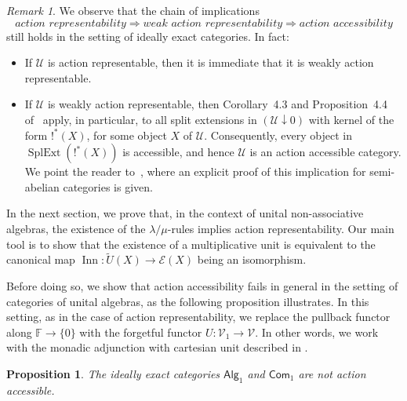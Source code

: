 \documentclass[reqno,a4paper]{amsart}
\theoremstyle{plain}
\newtheorem{proposition}[subsection]{Proposition}
\theoremstyle{definition}
\theoremstyle{remark}
\newtheorem{remark}[subsection]{Remark}
\numberwithin{equation}{section}
\newcommand{\F}{\mathbb{F}}
\newcommand{\E}{\mathcal{E}}
\newcommand{\V}{\mathcal{V}}
\newcommand{\U}{\mathcal{U}}
\DeclareMathOperator{\SplExt}{SplExt}
\DeclareMathOperator{\Inn}{Inn}
\newcommand{\Com}{\ensuremath{\mathsf{Com}}}
\newcommand{\Alg}{\ensuremath{\mathsf{Alg}}}
\begin{document}
\begin{remark}
We observe that the chain of implications
\[
\textit{action representability}\Rightarrow\textit{weak action representability}\Rightarrow\textit{action accessibility}
\]
still holds in the setting of ideally exact categories. In fact:
\begin{itemize}
\item If $\U$ is action representable, then it is immediate that it is weakly action representable.
\item If $\U$ is weakly action representable, then Corollary~4.3 and Proposition~4.4 of~\cite{WRA} apply, in particular, to all split extensions in $(\U \downarrow 0)$ with kernel of the form $!^*(X)$, for some object $X$ of $\U$. Consequently, every object in $\SplExt(!^*(X))$ is accessible, and hence $\U$ is an action accessible category. We point the reader to~\cite[Section 2]{Mancini_Thesis}, where an explicit proof of this implication for semi-abelian categories is given.
\end{itemize}
\end{remark}

In the next section, we prove that, in the context of unital non-associative algebras, the existence of the $\lambda/\mu$-rules implies action representability. Our main tool is to show that the existence of a multiplicative unit is equivalent to the canonical map $\Inn \colon \widetilde{U}(X) \to \E(X)$ being an isomorphism.

Before doing so, we show that action accessibility fails in general in the setting of categories of unital algebras, as the following proposition illustrates. In this setting, as in the case of action representability, we replace the pullback functor along $\F \to \{0\}$ with the forgetful functor $U \colon \V_1 \to \V$. In other words, we work with the monadic adjunction with cartesian unit described in .

\begin{proposition}
The ideally exact categories $\Alg_1$ and $\Com_1$ are not action accessible.
\end{proposition}
\end{document}
